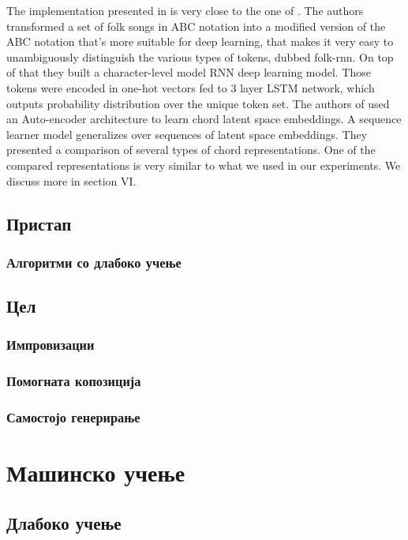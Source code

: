 The implementation presented in \cite{Sturm2015} is very close to the one of \cite{AndrejKarpathy2015}. The authors transformed a set of folk songs in ABC notation into a modified version of the ABC notation that's more suitable for deep learning, that makes it very easy to unambiguously distinguish the various types of tokens, dubbed folk-rnn. On top of that they built a character-level model RNN deep learning model. Those tokens were encoded in one-hot vectors fed to 3 layer LSTM network, which outputs probability distribution over the unique token set. 
The authors of \cite{Madjiheurem2016} used an Auto-encoder architecture to learn chord latent space embeddings. A sequence learner model generalizes over sequences of latent space embeddings. They presented a comparison of several types of chord representations. One of the compared representations is very similar to what we used in our experiments. We discuss more in section VI.

\section{Пристап}

\subsection{Алгоритми со длабоко учење} 

\section{Цел}



\subsection{Импровизации} 
\subsection{Помогната копозиција} 
\subsection{Самостојо генерирање} 

\chapter{Машинско учење}

\section{Длабоко учење}

